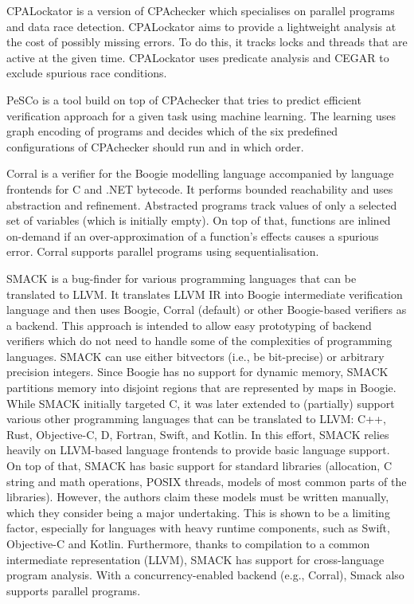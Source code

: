 CPALockator  is a version of CPAchecker which specialises on parallel programs and data race detection.
CPALockator aims to provide a lightweight analysis at the cost of possibly missing errors.
To do this, it tracks locks and threads that are active at the given time.
CPALockator uses predicate analysis and CEGAR to exclude spurious race conditions.

PeSCo  is a tool build on top of CPAchecker that tries to predict efficient verification approach for a given task using machine learning.
The learning uses graph encoding of programs and decides which of the six predefined configurations of CPAchecker should run and in which order.

Corral  is a verifier for the Boogie modelling language accompanied by language frontends for C and .NET bytecode.
It performs bounded reachability and uses abstraction and refinement.
Abstracted programs track values of only a selected set of variables (which is initially empty).
On top of that, functions are inlined on-demand if an over-approximation of a function's effects causes a spurious error.
Corral supports parallel programs using sequentialisation.

SMACK  is a bug-finder for various programming languages that can be translated to LLVM.
It translates LLVM IR into Boogie intermediate verification language and then uses Boogie, Corral (default) or other Boogie-based verifiers as a backend.
This approach is intended to allow easy prototyping of backend verifiers which do not need to handle some of the complexities of programming languages.
SMACK can use either bitvectors (i.e., be bit-precise) or arbitrary precision integers.
Since Boogie has no support for dynamic memory, SMACK partitions memory into disjoint regions that are represented by maps in Boogie.
While SMACK initially targeted C, it was later extended to (partially) support various other programming languages that can be translated to LLVM: C++, Rust, Objective-C, D, Fortran, Swift, and Kotlin.
In this effort, SMACK relies heavily on LLVM-based language frontends to provide basic language support.
On top of that, SMACK has basic support for standard libraries (allocation, C string and math operations, POSIX threads, models of most common parts of the libraries).
However, the authors claim these models must be written manually, which they consider being a major undertaking.
This is shown to be a limiting factor, especially for languages with heavy runtime components, such as Swift, Objective-C and Kotlin.
Furthermore, thanks to compilation to a common intermediate representation (LLVM), SMACK has support for cross-language program analysis.
With a concurrency-enabled backend (e.g., Corral), Smack also supports parallel programs.

